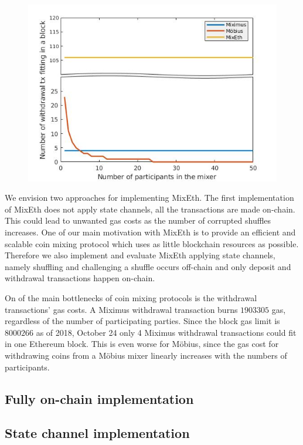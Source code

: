 \documentclass[a4paper]{article}
\theoremstyle{definition}
\begin{document}
\begin{figure}
	\centering
	\includegraphics[scale=0.7]{./withdrawalComplexity.jpg}
\end{figure}

We envision two approaches for implementing MixEth. The first implementation of MixEth does not apply state channels, all the transactions are made on-chain. This could lead to unwanted gas costs as the number of corrupted shuffles increases. One of our main motivation with MixEth is to provide an efficient and scalable coin mixing protocol which uses as little blockchain resources as possible. Therefore we also implement and evaluate MixEth applying state channels, namely shuffling and challenging a shuffle occurs off-chain and only deposit and withdrawal transactions happen on-chain. 

On of the main bottlenecks of coin mixing protocols is the withdrawal transactions' gas costs. A Miximus withdrawal transaction burns $\num[group-separator={,}]{1903305}$ gas, regardless of the number of participating parties. Since the block gas limit is $\num[group-separator={,}]{8000266}$ as of 2018, October 24 only 4 Miximus withdrawal transactions could fit in one Ethereum block. This is even worse for Möbius, since the gas cost for withdrawing coins from a Möbius mixer linearly increases with the numbers of participants.    

\subsection{Fully on-chain implementation}

\subsection{State channel implementation}
\end{document}
